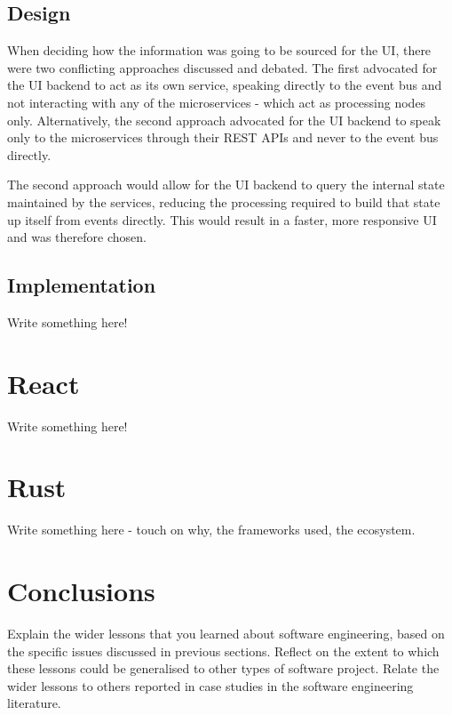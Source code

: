 \documentclass{l3proj}
\begin{document}
\subsection{Design}
When deciding how the information was going to be sourced for the UI, there were two conflicting approaches discussed and debated. The first advocated for the UI backend to act as its own service, speaking directly to the event bus and not interacting with any of the microservices - which act as processing nodes only. Alternatively, the second approach advocated for the UI backend to speak only to the microservices through their REST APIs and never to the event bus directly.

The second approach would allow for the UI backend to query the internal state maintained by the services, reducing the processing required to build that state up itself from events directly. This would result in a faster, more responsive UI and was therefore chosen.

\subsection{Implementation}
Write something here!

\section{React}
\label{sec:react}
Write something here!

\section{Rust}
\label{sec:rust}
Write something here - touch on why, the frameworks used, the ecosystem.

\section{Conclusions}
\label{sec:conclusions}

Explain the wider lessons that you learned about software engineering,
based on the specific issues discussed in previous sections.  Reflect
on the extent to which these lessons could be generalised to other
types of software project.  Relate the wider lessons to others
reported in case studies in the software engineering literature.



\end{document}
